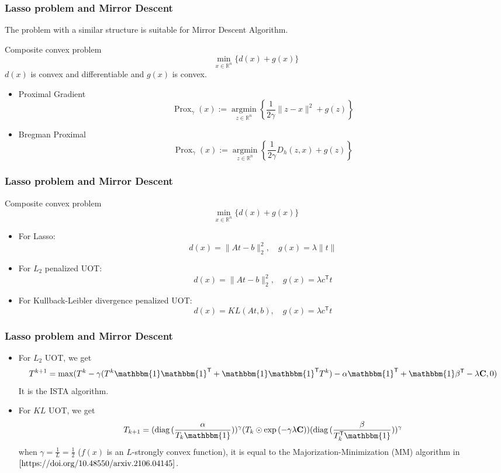\documentclass[dvipdfmx,cjk,t,10pt]{beamer}
\newcommand{\C}{\mathbf C}
\newcommand{\diag}{\operatorname{diag}}
\newcommand{\tranT}{\mathsf T}
\begin{document}
\begin{frame}
\frametitle{Lasso problem and Mirror Descent }
	The problem with a similar structure is suitable for Mirror Descent Algorithm. 
		\begin{screen}{Composite convex problem}
$$
\min _{x \in \mathbb{R}^{n}}\{d(x)+g(x)\}
$$
$d(x)$ is convex and differentiable and $g(x)$ is convex.
	\end{screen}	

\begin{itemize}
	\item Proximal Gradient
	$$
\operatorname{Prox}_{\gamma}(x):=\underset{z \in \mathbb{R}^{n}}{\operatorname{argmin}}\left\{\frac{1}{2 \gamma}\|z-x\|^{2}+g(z)\right\}
$$
	\item Bregman Proximal
	$$
\operatorname{Prox}_{\gamma}(x):=\underset{z \in \mathbb{R}^{n}}{\operatorname{argmin}}\left\{\frac{1}{2 \gamma}D_h(z,x)+g(z)\right\}
$$
	
\end{itemize}
\end{frame}


\begin{frame}
\frametitle{Lasso problem and Mirror Descent}
		\begin{screen}{Composite convex problem}
$$
\min _{x \in \mathbb{R}^{n}}\{d(x)+g(x)\}
$$
	\end{screen}	
\begin{itemize}
	\item For Lasso:
	$$
		d(x)= \|At-b\|_2^2, \quad g(x) = \lambda \|t\|
	$$
	
	\item For $L_2$ penalized UOT:
	$$
		d(x)= \|At-b\|_2^2, \quad g(x) = \lambda c^{\tranT}t
	$$

	\item For Kullback-Leibler divergence penalized UOT:
	$$
		d(x)= KL(At,b),\quad g(x) =  \lambda c^{\tranT}t
	$$
\end{itemize}

\end{frame}

\begin{frame}
\frametitle{Lasso problem and Mirror Descent}
\begin{itemize}
\item For $L_2$ UOT, we get
$$
 T^{k+1} = \max(T^{k} -\gamma (T^{k}\mathbbm{1}\mathbbm{1}^{\tranT}+\mathbbm{1}\mathbbm{1}^{\tranT}T^{k})-\alpha\mathbbm{1}^{\tranT}+\mathbbm{1}\beta^{\tranT}-\lambda \C,0)
$$
It is the ISTA algorithm. 
\item For $KL$ UOT, we get
$$
T_{k+1}= (\diag{(\frac{\alpha}{T_k\mathbbm{1}})})^{\gamma}(T_k\odot \exp{(-\gamma \lambda \C)})(\diag{(\frac{\beta}{T_k^{\tranT}\mathbbm{1}})})^{\gamma} 
$$
when $\gamma = \frac{1}{L} = \frac{1}{2}$ ($f(x)$ is an $L$-strongly convex function), it is equal to the Majorization-Minimization (MM) algorithm in $\cite{https://doi.org/10.48550/arxiv.2106.04145}$.
\end{itemize}
\end{frame}
\end{document}

